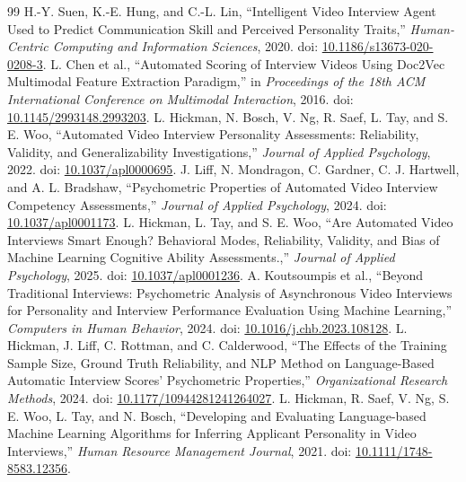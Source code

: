 \documentclass[journal]{IEEEtran}
\begin{document}
\begin{thebibliography}{99}
 H.-Y. Suen, K.-E. Hung, and C.-L. Lin, ``Intelligent Video Interview Agent Used to Predict Communication Skill and Perceived Personality Traits,'' \emph{Human-Centric Computing and Information Sciences}, 2020. doi: \href{https://doi.org/10.1186/s13673-020-0208-3}{10.1186/s13673-020-0208-3}.
 L. Chen et al., ``Automated Scoring of Interview Videos Using Doc2Vec Multimodal Feature Extraction Paradigm,'' in \emph{Proceedings of the 18th ACM International Conference on Multimodal Interaction}, 2016. doi: \href{https://doi.org/10.1145/2993148.2993203}{10.1145/2993148.2993203}.
 L. Hickman, N. Bosch, V. Ng, R. Saef, L. Tay, and S. E. Woo, ``Automated Video Interview Personality Assessments: Reliability, Validity, and Generalizability Investigations,'' \emph{Journal of Applied Psychology}, 2022. doi: \href{https://doi.org/10.1037/apl0000695}{10.1037/apl0000695}.
 J. Liff, N. Mondragon, C. Gardner, C. J. Hartwell, and A. L. Bradshaw, ``Psychometric Properties of Automated Video Interview Competency Assessments,'' \emph{Journal of Applied Psychology}, 2024. doi: \href{https://doi.org/10.1037/apl0001173}{10.1037/apl0001173}.
 L. Hickman, L. Tay, and S. E. Woo, ``Are Automated Video Interviews Smart Enough? Behavioral Modes, Reliability, Validity, and Bias of Machine Learning Cognitive Ability Assessments.,'' \emph{Journal of Applied Psychology}, 2025. doi: \href{https://doi.org/10.1037/apl0001236}{10.1037/apl0001236}.
 A. Koutsoumpis et al., ``Beyond Traditional Interviews: Psychometric Analysis of Asynchronous Video Interviews for Personality and Interview Performance Evaluation Using Machine Learning,'' \emph{Computers in Human Behavior}, 2024. doi: \href{https://doi.org/10.1016/j.chb.2023.108128}{10.1016/j.chb.2023.108128}.
 L. Hickman, J. Liff, C. Rottman, and C. Calderwood, ``The Effects of the Training Sample Size, Ground Truth Reliability, and NLP Method on Language-Based Automatic Interview Scores' Psychometric Properties,'' \emph{Organizational Research Methods}, 2024. doi: \href{https://doi.org/10.1177/10944281241264027}{10.1177/10944281241264027}.
 L. Hickman, R. Saef, V. Ng, S. E. Woo, L. Tay, and N. Bosch, ``Developing and Evaluating Language-based Machine Learning Algorithms for Inferring Applicant Personality in Video Interviews,'' \emph{Human Resource Management Journal}, 2021. doi: \href{https://doi.org/10.1111/1748-8583.12356}{10.1111/1748-8583.12356}.

\end{thebibliography}
\end{document}
